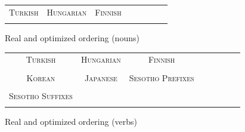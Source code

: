 \documentclass[11pt,letterpaper]{article}
\begin{document}
\begin{figure}[]
\begin{tabular}{cccccccc}
\textsc{Turkish} & \textsc{Hungarian} & \textsc{Finnish} \\
\begin{minipage}{.3\textwidth}
  
    \end{minipage}
  &
  \begin{minipage}{.3\textwidth}
  
    \end{minipage}
  &
  \begin{minipage}{.3\textwidth}
  
  \end{minipage}
  \end{tabular}
  
    \caption{Real and optimized ordering (nouns)}
    \label{fig:real_and_optimized_nouns}
\end{figure}


\begin{figure}[]

\begin{tabular}{cccccccc}
\textsc{Turkish} & \textsc{Hungarian} & \textsc{Finnish} \\
\begin{minipage}{.3\textwidth}
  
  \end{minipage}
  &
  \begin{minipage}{.3\textwidth}
  
  \end{minipage}
  &
    \begin{minipage}{.3\textwidth}
  
  \end{minipage}
  \\
  \textsc{Korean}  & \textsc{Japanese} & \textsc{Sesotho Prefixes} \\
      \begin{minipage}{.3\textwidth}
  
  \end{minipage}
  &
  \begin{minipage}{.3\textwidth}
  
  \end{minipage}
  &
  \begin{minipage}{.3\textwidth}
  
  \end{minipage} \\
  \textsc{Sesotho Suffixes} \\
  \begin{minipage}{.3\textwidth}
  
  \end{minipage}
  \end{tabular}
  
  
    \caption{Real and optimized ordering (verbs)}
    \label{fig:real_and_optimized_verbs}
\end{figure}
\end{document}
